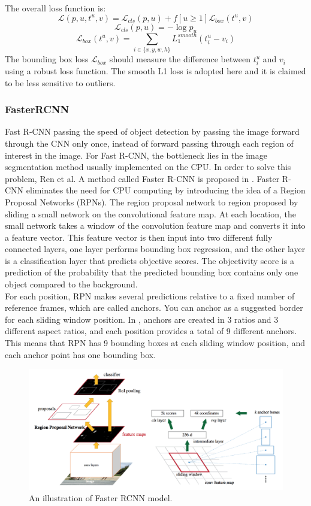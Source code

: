 The overall loss function is:
\begin{equation}
	\mathcal{L}(p, u, t^u, v) = \mathcal{L}_{cls} (p, u) + f [u \geq 1] \mathcal{L}_{box}(t^u, v)
\end{equation}\begin{equation}
	\mathcal{L}_{cls}(p, u) = -\log p_u
\end{equation}
\begin{equation}
	\mathcal{L}_{box}(t^u, v) = \sum_{i \in \{x, y, w, h\}} L_1^{smooth} (t^u_i - v_i)
\end{equation}
The bounding box loss \(\mathcal{L}_{box}\) should measure the difference between \(t^u_i\) and \(v_i\) using a robust loss function. The smooth L1 loss is adopted here and it is claimed to be less sensitive to outliers.
\subsubsection{FasterRCNN}
Fast R-CNN passing the speed of object detection by passing the image forward through the CNN only once, instead of forward passing through each region of interest in the image. For Fast R-CNN, the bottleneck lies in the image segmentation method usually implemented on the CPU. In order to solve this problem, Ren et al. A method called Faster R-CNN is proposed in \cite{DBLP:journals/corr/RenHG015}. Faster R-CNN eliminates the need for CPU computing by introducing the idea of a Region Proposal Networks (RPNs). The region proposal network to region proposed by sliding a small network on the convolutional feature map. At each location, the small network takes a window of the convolution feature map and converts it into a feature vector. This feature vector is then input into two different fully connected layers, one layer performs bounding box regression, and the other layer is a classification layer that predicts objective scores. The objectivity score is a prediction of the probability that the predicted bounding box contains only one object compared to the background.
\\For each position, RPN makes several predictions relative to a fixed number of reference frames, which are called anchors. You can anchor as a suggested border for each sliding window position. In \cite{DBLP:journals/corr/RenHG015}, anchors are created in 3 ratios and 3 different aspect ratios, and each position provides a total of 9 different anchors. This means that RPN has 9 bounding boxes at each sliding window position, and each anchor point has one bounding box.
\begin{figure}
	\centerline{\includegraphics[width=0.5\linewidth]{Figs/faster.png}}
	\caption{An illustration of Faster RCNN model.}
	\label{fig:faster}
\end{figure}
